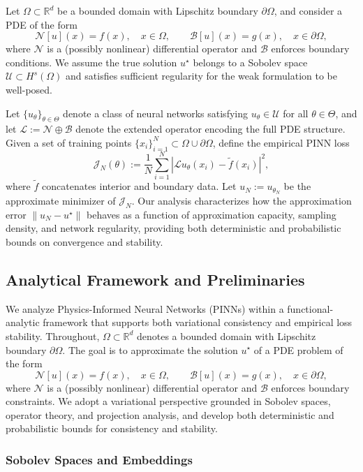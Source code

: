 \documentclass[11pt, a4paper]{article}
\begin{document}
Let $\Omega \subset \mathbb{R}^d$ be a bounded domain with Lipschitz boundary $\partial \Omega$, and consider a PDE of the form
\[
\mathcal{N}[u](x) = f(x), \quad x \in \Omega, \qquad \mathcal{B}[u](x) = g(x), \quad x \in \partial \Omega,
\]
where $\mathcal{N}$ is a (possibly nonlinear) differential operator and $\mathcal{B}$ enforces boundary conditions. We assume the true solution $u^\star$ belongs to a Sobolev space $\mathcal{U} \subset H^s(\Omega)$ and satisfies sufficient regularity for the weak formulation to be well-posed.

Let $\{ u_\theta \}_{\theta \in \Theta}$ denote a class of neural networks satisfying $u_\theta \in \mathcal{U}$ for all $\theta \in \Theta$, and let $\mathcal{L} := \mathcal{N} \oplus \mathcal{B}$ denote the extended operator encoding the full PDE structure. Given a set of training points $\{x_i\}_{i=1}^N \subset \Omega \cup \partial\Omega$, define the empirical PINN loss
\[
\mathcal{J}_N(\theta) := \frac{1}{N} \sum_{i=1}^N \left| \mathcal{L} u_\theta(x_i) - \tilde{f}(x_i) \right|^2,
\]
where $\tilde{f}$ concatenates interior and boundary data. Let $u_N := u_{\theta_N}$ be the approximate minimizer of $\mathcal{J}_N$. Our analysis characterizes how the approximation error $\| u_N - u^\star \|$ behaves as a function of approximation capacity, sampling density, and network regularity, providing both deterministic and probabilistic bounds on convergence and stability.


\subsection{Analytical Framework and Preliminaries}

We analyze Physics-Informed Neural Networks (PINNs) within a functional-analytic framework that supports both variational consistency and empirical loss stability. Throughout, $\Omega \subset \mathbb{R}^d$ denotes a bounded domain with Lipschitz boundary $\partial\Omega$. The goal is to approximate the solution $u^\star$ of a PDE problem of the form
\[
\mathcal{N}[u](x) = f(x), \quad x \in \Omega, \qquad \mathcal{B}[u](x) = g(x), \quad x \in \partial \Omega,
\]
where $\mathcal{N}$ is a (possibly nonlinear) differential operator and $\mathcal{B}$ enforces boundary constraints. We adopt a variational perspective grounded in Sobolev spaces, operator theory, and projection analysis, and develop both deterministic and probabilistic bounds for consistency and stability.

\subsubsection{Sobolev Spaces and Embeddings}
\end{document}
